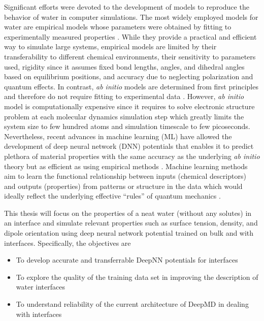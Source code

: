 Significant efforts were devoted to the development of models to reproduce the
behavior of water in computer simulations. The most
widely employed models for water are empirical models whose
parameters were obtained by fitting to experimentally measured properties \cite{Duin2001,brenner2002second,daw1984embedded}. While they provide a practical and efficient way to simulate large systems, empirical models are limited by their transferability to different chemical environments, their sensitivity to parameters used, rigidity since it assumes fixed bond lengths, angles, and dihedral angles based on equilibrium positions, and accuracy due to neglecting polarization and quantum effects. In contrast, \emph{ab initio} models are
determined from first principles and
therefore do not require fitting to experimental data \cite{car1985unified,Marx2009,kohn1965self}. However, \emph{ab initio} model is
computationally expensive since it requires to solve electronic structure problem at each molecular dynamics simulation step which greatly limits the  system size to few hundred atoms
and simulation timescale to few picoseconds. Nevertheless,
recent advances in machine learning (ML) have allowed the development of deep
neural network (DNN) potentials that
enables it to predict plethora of material properties  with the
same accuracy as the underlying \emph{ab initio} theory but as efficient as using
empirical methods \cite{Thompson2015,Huan2017,Behler2007,Behler2016,Chmiela2017,Unke2021}.
Machine learning methods aim to learn the functional relationship between inputs (chemical descriptors) and outputs (properties) from patterns or structure in the data which would ideally reflect  the underlying
effective ``rules'' of quantum mechanics \cite{schutt2020machine}.


This thesis will focus on the properties of a neat water (without any
solutes) in an interface and simulate relevant properties such as surface
tension, density, and dipole orientation using deep neural network potential
trained on bulk and with interfaces. Specifically, the objectives are

\begin{itemize}
    \item To develop accurate and transferrable DeepNN potentials for
          interfaces
    \item To explore the quality of the training data set in improving the
          description of water interfaces
    \item To understand reliability of the current architecture of DeepMD in
          dealing with interfaces
\end{itemize}

